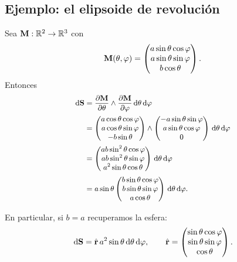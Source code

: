 \subsection{Ejemplo: el elipsoide de revoluci\'on}
\label{subsec:elipsoide}

Sea $\mathbf{M}:\mathbb{R}^2\rightarrow\mathbb{R}^3$ con
\begin{equation}
  \label{eq:elipsoide_param}
  \mathbf{M}(\theta,\varphi)=
  \begin{pmatrix}
    a\sin\theta\cos\varphi\\
    a\sin\theta\sin\varphi\\
    b\cos\theta
  \end{pmatrix}.
\end{equation}
Entonces
\begin{equation}
  \label{eq:dS_elipsoide}
  \small
  \begin{aligned}
    \,\mathrm{d}\mathbf{S}
      &=\frac{\partial \mathbf{M}}{\partial \theta}\wedge\frac{\partial \mathbf{M}}{\partial \varphi}
        \,\mathrm{d}\theta\,\mathrm{d}\varphi\\
      &=
      \begin{pmatrix}
        a\cos\theta\cos\varphi\\
        a\cos\theta\sin\varphi\\
        -b\sin\theta
      \end{pmatrix}
      \wedge
      \begin{pmatrix}
        -a\sin\theta\sin\varphi\\
        a\sin\theta\cos\varphi\\
        0
      \end{pmatrix}
      \,\mathrm{d}\theta\,\mathrm{d}\varphi\\
      &=
      \begin{pmatrix}
        ab\sin^2\theta\cos\varphi\\
        ab\sin^2\theta\sin\varphi\\
        a^2\sin\theta\cos\theta
      \end{pmatrix}
      \,\mathrm{d}\theta\,\mathrm{d}\varphi\\
      &=a\sin\theta
      \begin{pmatrix}
        b\sin\theta\cos\varphi\\
        b\sin\theta\sin\varphi\\
        a\cos\theta
      \end{pmatrix}
      \,\mathrm{d}\theta\,\mathrm{d}\varphi .
  \end{aligned}
\end{equation}

En particular, si $b=a$ recuperamos la esfera:
\begin{equation}
  \label{eq:dS_esfera}
  \,\mathrm{d}\mathbf{S}=\hat{\mathbf{r}}\,a^2\sin\theta\,\mathrm{d}\theta\,\mathrm{d}\varphi,
  \qquad
  \hat{\mathbf{r}}=
  \begin{pmatrix}
    \sin\theta\cos\varphi\\
    \sin\theta\sin\varphi\\
    \cos\theta
  \end{pmatrix}.
\end{equation}

